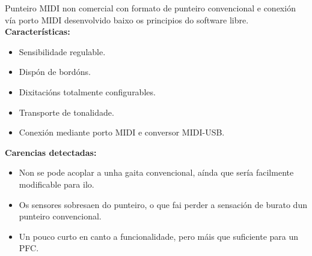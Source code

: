   Punteiro MIDI non comercial con formato de punteiro convencional e conexión
  vía porto MIDI desenvolvido baixo os principios do software libre. \\

  \textbf{Características:}

  \begin{itemize}
   \item Sensibilidade regulable.
   \item Dispón de bordóns.
   \item Dixitacións totalmente configurables.
   \item Transporte de tonalidade.
   \item Conexión mediante porto MIDI e conversor MIDI-USB.
  \end{itemize}

  \textbf{Carencias detectadas:}

  \begin{itemize}
   \item Non se pode acoplar a unha gaita convencional, aínda que sería
         facilmente modificable para ilo.
   \item Os sensores sobresaen do punteiro, o que fai perder a sensación de
         burato dun punteiro convencional.
   \item Un pouco curto en canto a funcionalidade, pero máis que suficiente
         para un PFC.
  \end{itemize}
